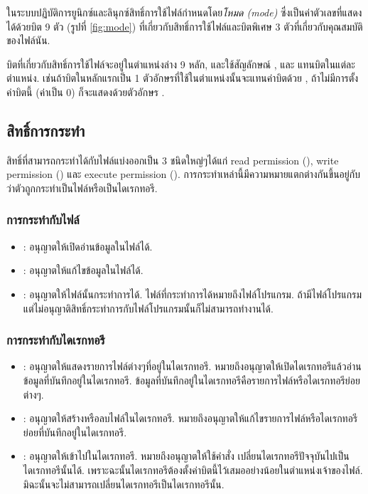 \begin{thwbr}
\begin{figure}[!htb]
\end{figure}


ในระบบปฏิบัติการยูนิกซ์และลินุกซ์สิทธิ์การใช้ไฟล์กำหนดโดย\emph{โหมด (mode)} ซึ่งเป็นค่าตัวเลขที่แสดงได้ด้วยบิต 9 ตัว (รูปที่ \ref{fig:mode}) ที่เกี่ยวกับสิทธิ์การใช้ไฟล์และบิตพิเศษ 3 ตัวที่เกี่ยวกับคุณสมบัติของไฟล์นัน. 

บิตที่เกี่ยวกับสิทธิ์การใช้ไฟล์จะอยู่ในตำแหน่งล่าง 9 หลัก, และใช้สัญลักษณ์ ,  และ  แทนบิตในแต่ละตำแหน่ง. เช่นถ้าบิตในหลักแรกเป็น 1 ตัวอักษรที่ใช้ในตำแหน่งนั้นจะแทนค่าบิตด้วย , ถ้าไม่มีการตั้งค่าบิตนี้ (ค่าเป็น 0) ก็จะแสดงด้วยตัวอักษร \cmd{-}.

\subsection{สิทธิ์การกระทำ}
สิทธิ์ที่สามารถกระทำได้กับไฟล์แบ่งออกเป็น 3 ชนิดใหญ่ๆได้แก่ read permission (), write permission () และ execute permission (). การกระทำเหล่านี้มีความหมายแตกต่างกันขึ้นอยู่กับว่าตัวถูกกระทำเป็นไฟล์หรือเป็นไดเรกทอรี.
\subsubsection{การกระทำกับไฟล์}
\begin{itemize}
\item {} : อนุญาตให้เปิดอ่านข้อมูลในไฟล์ได้.
\item {} : อนุญาตให้แก้ไขข้อมูลในไฟล์ได้.
\item {} : อนุญาตให้ไฟล์นั้นกระทำการได้. ไฟล์ที่กระทำการได้หมายถึงไฟล์โปรแกรม. ถ้ามีไฟล์โปรแกรมแต่ไม่อนุญาติสิทธิ์กระทำการกับไฟล์โปรแกรมนั้นก็ไม่สามารถทำงานได้.
\end{itemize}
\subsubsection{การกระทำกับไดเรกทอรี}
\begin{itemize}
\item {} : อนุญาตให้แสดงรายการไฟล์ต่างๆที่อยู่ในไดเรกทอรี. หมายถึงอนุญาตให้เปิดไดเรกทอรีแล้วอ่านข้อมูลที่บันทึกอยู่ในไดเรกทอรี. ข้อมูลที่บันทึกอยู่ในไดเรกทอรีคือรายการไฟล์หรือไดเรกทอรีย่อยต่างๆ.
\item {} : อนุญาตให้สร้างหรือลบไฟล์ในไดเรกทอรี. หมายถึงอนุญาตให้แก้ไขรายการไฟล์หรือไดเรกทอรีย่อยที่บันทึกอยู่ในไดเรกทอรี.
\item {} : อนุญาตให้เข้าไปในไดเรกทอรี. หมายถึงอนุญาตให้ใช้คำสั่ง  เปลี่ยนไดเรกทอรีปัจจุบันไปเป็นไดเรกทอรีนั้นได้. เพราะฉะนั้นไดเรกทอรีต้องตั้งค่าบิตนี้ไว้เสมออย่างน้อยในตำแหน่งเจ้าของไฟล์. มิฉะนั้นจะไม่สามารถเปลี่ยนไดเรกทอรีเป็นไดเรกทอรีนั้น.
\end{itemize}




\end{thwbr}
